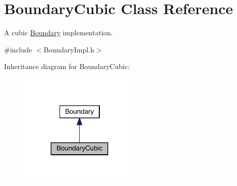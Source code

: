 \hypertarget{classBoundaryCubic}{\section{Boundary\+Cubic Class Reference}
\label{classBoundaryCubic}
}


A cubic \hyperlink{classBoundary}{Boundary} implementation.  




{\ttfamily \#include $<$Boundary\+Impl.\+h$>$}



Inheritance diagram for Boundary\+Cubic\+:\nopagebreak
\begin{figure}[H]
\begin{center}
\leavevmode
\includegraphics[width=164pt]{classBoundaryCubic__inherit__graph}
\end{center}
\end{figure}


